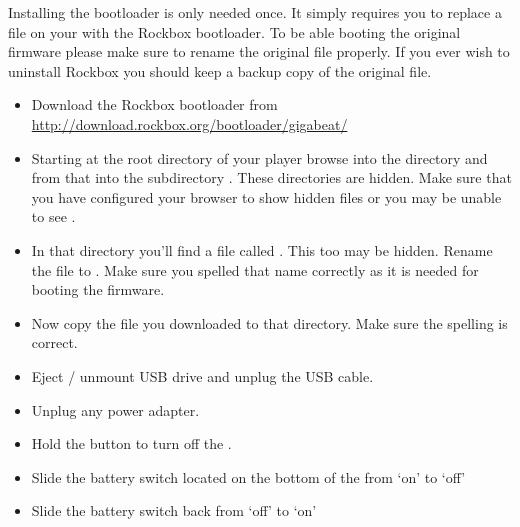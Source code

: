 
Installing the bootloader is only needed once. It simply requires you
to replace a file on your \dap{} with the Rockbox bootloader. To be able
booting the original firmware please make sure to rename the original file
properly. If you ever wish to uninstall Rockbox you should keep a backup copy
of the original file.

\begin{itemize}
\item Download the Rockbox bootloader from
  \url{http://download.rockbox.org/bootloader/gigabeat/}
\item Starting at the root directory of your player browse into the directory
   and from that into the subdirectory .
  These directories are hidden. Make sure that you have configured your browser
  to show hidden files or you may be unable to see .
\item In that directory you'll find a file called . This too
  may be hidden. Rename the file to . Make sure you
  spelled that name  correctly as it is needed for booting the \playerman{} firmware.
\item Now copy the file  you downloaded to that directory.
  Make sure the spelling is correct.
\end{itemize}

\begin{itemize}
\item Eject / unmount USB drive and unplug the USB cable.
\item Unplug any power adapter.
\item Hold the \ButtonPower{} button to turn off the \dap{}.
\item Slide the battery switch located on the bottom of the \dap{} from 
    `on' to `off'
\item Slide the battery switch back from `off' to `on'
\end{itemize}
